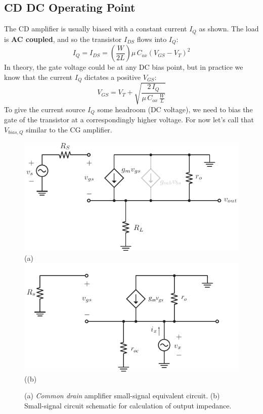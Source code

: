 \subsection{CD DC Operating Point}
The CD amplifier is usually biased with a constant current $I_Q$ as shown.  The load is \textbf{AC coupled}, and so the transistor $I_{DS}$ flows into $I_Q$:
    \begin{equation*}
        I_Q = I_{DS} = \left(\frac{W}{2L}\right)\mu\,C_{ox}{(V_{GS} - V_T)}^2	
    \end{equation*}
In theory, the gate voltage could be at any DC bias point, but in practice we know that the current $I_Q$ dictates a positive $V_{GS}$:
    \begin{equation*}
        V_{GS} = V_T + \sqrt{\frac{2\,I_{Q}}{\mu\,C_{ox}\,\frac{W}{L}}}
    \end{equation*}
To give the current source $I_Q$ some headroom (DC voltage), we need to bias the gate of the transistor at a correspondingly higher voltage.  For now let's call that $V_{bias,Q}$ similar to the CG amplifier.
\newpage
\begin{figure}[t]
\centering
\includegraphics[scale=1.15]{cd_amp_ss_av2}\\
(a)\\
\includegraphics[scale=1.15]{cd_amp_ss_rout}\\
((b)\\
\caption{(a) \textit{Common drain} amplifier small-signal equivalent circuit.  (b) Small-signal circuit schematic for calculation of output impedance.}
\label{fig:cd_amp_ss_av2}
\end{figure}

